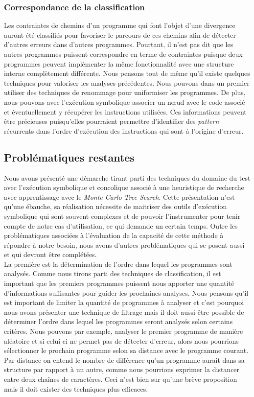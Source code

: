 \subsubsection*{Correspondance de la classification}
Les contraintes de chemins d'un programme qui font l'objet d'une divergence auront été classifiés pour favoriser le parcours de ces chemins afin de détecter d'autres erreurs dans d'autres programmes.
Pourtant, il n'est pas dit que les autres programmes puissent correspondre en terme de contraintes puisque deux programmes peuvent implémenter la même fonctionnalité avec une structure interne complètement différente. 
Nous pensons tout de même qu'il existe quelques techniques pour valoriser les analyses précédentes. Nous pouvons dans un premier utiliser des techniques de renommage pour uniformiser les programmes. De plus, nous pouvons avec l'exécution symbolique associer un nœud avec le code associé et éventuellement y récupérer les instructions utilisées. Ces informations peuvent être précieuses puisqu'elles pourraient permettre d'identifier des \textit{pattern} récurrents dans l'ordre d'exécution des instructions qui sont à l'origine d'erreur.

\subsection{Problématiques restantes}
Nous avons présenté une démarche tirant parti des techniques du domaine du test avec l'exécution symbolique et concolique associé à une heuristique de recherche avec apprentissage avec le \textit{Monte Carlo Tree Search}. Cette présentation n'est qu'une ébauche, sa réalisation nécessite de maitriser des outils d'exécution symbolique qui sont souvent complexes et de pouvoir l'instrumenter pour tenir compte de notre cas d'utilisation, ce qui demande un certain temps. Outre les problématiques associées à l'évaluation de la capacité de cette méthode à répondre à notre besoin, nous avons d'autres problématiques qui se posent aussi et qui devront être complétées.\\

La première est la détermination de l'ordre dans lequel les programmes sont analysés. Comme nous tirons parti des techniques de classification, il est important que les premiers programmes puissent nous apporter une quantité d'informations suffisantes pour guider les prochaines analyses. Nous pensons qu'il est important de limiter la quantité de programmes à analyser et c'est pourquoi nous avons présenter une technique de filtrage mais il doit aussi être possible de déterminer l'ordre dans lequel les programmes seront analysés selon certains critères. Nous pouvons par exemple, analyser le premier programme de manière aléatoire et si celui ci ne permet pas de détecter d'erreur, alors nous pourrions sélectionner le prochain programme selon sa distance avec le programme courant. Par distance on entend le nombre de différence qu'un programme aurait dans sa structure par rapport à un autre, comme nous pourrions exprimer la distancer entre deux chaînes de caractères. Ceci n'est bien sur qu'une brève proposition mais il doit exister des techniques plus efficaces.\\

